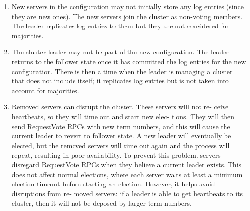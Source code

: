 \begin{enumerate}
\item New servers in the configuration may not initially store any log entries (since they are new ones). The new servers join the cluster as non-voting members. The leader replicates log entries to them but they are not considered for majorities.
\item The cluster leader may not be part of the new configuration. The leader returns to the follower state once it has committed the log entries for the new configuration. There is then a time when the leader is managing a cluster that does not include itself; it replicates log entries but is not taken into account for majorities. 
\item Removed servers can disrupt the cluster. These servers will not re- ceive heartbeats, so they will time out and start new elec- tions. They will then send RequestVote RPCs with new term numbers, and this will cause the current leader to revert to follower state. A new leader will eventually be elected, but the removed servers will time out again and the process will repeat, resulting in poor availability. To prevent this problem, servers disregard RequestVote RPCs when they believe a current leader exists. This does not affect normal elections, where each server waits at least a minimum election timeout before starting an election. However, it helps avoid disruptions from re- moved servers: if a leader is able to get heartbeats to its cluster, then it will not be deposed by larger term numbers.
\end{enumerate}



